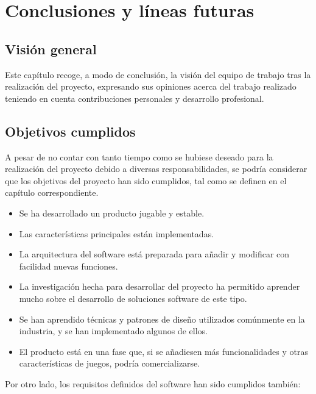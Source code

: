 \chapter{Conclusiones y líneas futuras}

\section{Visión general}

	Este capítulo recoge, a modo de conclusión, la visión del equipo de trabajo tras la realización del proyecto, expresando sus opiniones acerca del trabajo realizado teniendo en cuenta contribuciones personales y desarrollo profesional.

\section{Objetivos cumplidos}

	A pesar de no contar con tanto tiempo como se hubiese deseado para la realización del proyecto debido a diversas responsabilidades, se podría considerar que los objetivos del proyecto han sido cumplidos, tal como se definen en el capítulo correspondiente.

	\begin{itemize}

		\item Se ha desarrollado un producto jugable y estable.

		\item Las características principales están implementadas.

		\item La arquitectura del software está preparada para añadir y modificar con facilidad nuevas funciones.

		\item La investigación hecha para desarrollar del proyecto ha permitido aprender mucho sobre el desarrollo de soluciones software de este tipo.

		\item Se han aprendido técnicas y patrones de diseño utilizados comúnmente en la industria, y se han implementado algunos de ellos.

		\item El producto está en una fase que, si se añadiesen más funcionalidades y otras características de juegos, podría comercializarse.

	\end{itemize}

	Por otro lado, los requisitos definidos del software han sido cumplidos también:

